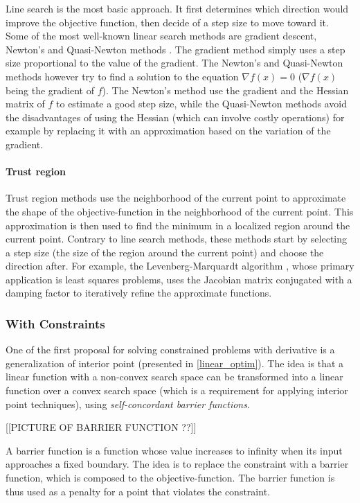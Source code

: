 Line search is the most basic approach. It first determines which direction would improve the objective function, then decide of a step size to move toward it.
Some of the most well-known linear search methods are gradient descent, Newton's and Quasi-Newton methods \cite{dennis1983numerical}. The gradient method simply uses a step size proportional to the value of the gradient. The Newton's and Quasi-Newton methods however try to find a solution to the equation $\nabla f(x)=0$ ($\nabla f(x)$ being the gradient of $f$). The Newton's method use the gradient  and the Hessian matrix of $f$ to estimate a good step size, while the Quasi-Newton methods avoid the disadvantages of using the Hessian (which can involve costly operations) for example by replacing it with an approximation based on the variation of the gradient.

\paragraph{Trust region}

Trust region methods use the neighborhood of the current point to approximate the shape of the objective-function in the neighborhood of the current point. This approximation is then used to find the minimum in a localized region around the current point. Contrary to line search methods, these methods start by selecting a step size (the size of the region around the current point) and choose the direction after.
For example, the Levenberg-Marquardt algorithm \cite{levenberg44,marquardt63}, whose primary application is least squares problems, uses the Jacobian matrix conjugated with a damping factor to iteratively refine the approximate functions.

\subsubsection{With Constraints}

One of the first proposal for solving constrained problems with derivative is a generalization of interior point (presented in \ref{linear_optim}). The idea is that a linear function with a non-convex search space can be transformed into a linear function over a convex search space (which is a requirement for applying interior point techniques), using \emph{self-concordant barrier functions}.

[[PICTURE OF BARRIER FUNCTION ??]]

A barrier function is a function whose value increases to infinity when its input approaches a fixed boundary.
The idea is to replace the constraint with a barrier function, which is composed to the objective-function. The barrier function is thus used as a penalty for a point that violates the constraint.

